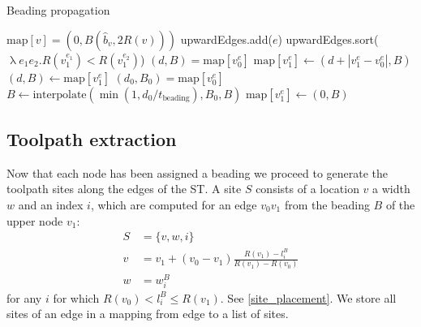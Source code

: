 
\begin{algorithm}
\caption{Beading propagation}
\label{alg_beading_propagation}
\begin{algorithmic}
	 $\text{map}[v] = (0, B(\hat{b}_v, 2 R(v)))$ \EndIf
\EndFor
{}
		upwardEdges.add($e$)
	\EndIf
\EndFor
\State upwardEdges.sort($\uplambda e_1 e_2 . R(v_1^{e_1}) < R(v_1^{e_2})$) 
 
    		\State $(d, B) = \text{map}[v_0^e]$
    		\State $\text{map}[v_1^e] \leftarrow (d + |v_1^e - v_0^e|, B)$
	\EndIf
\EndFor
{} 
    		\State $(d, B) \leftarrow \text{map}[v_1^e]$
    			\State $(d_0, B_0) = \text{map}[v_0^e]$
    			\State $B \leftarrow \text{interpolate}(\min(1, d_0 /  t_\text{beading}), B_0, B)$
    		\EndIf
    		\State $\text{map}[v_1^e] \leftarrow (0, B)$
	\EndIf
\EndFor
\end{algorithmic}
\end{algorithm}












\fi



\subsection{Toolpath extraction}\label{sec_toolpath_extraction}
Now that each node has been assigned a beading we proceed to generate the toolpath sites along the edges of the ST.
A site $S$ consists of a location $v$ a width $w$ and an index $i$, which are computed for an edge $v_0v_1$ from the beading $B$ of the upper node $v_1$:
\begin{align*}
S &= \{ v, w, i \} \\ 
v &= v_1 + (v_0 - v_1) \frac{R(v_1) - l_i^B}{R(v_1) - R(v_0)} \\ 
w &= w_i^B
\end{align*}
for any $i$ for which $R(v_0) < l_i^B \leq R(v_1)$.
See \cref{site_placement}.
We store all sites of an edge in a mapping from edge to a list of sites.


